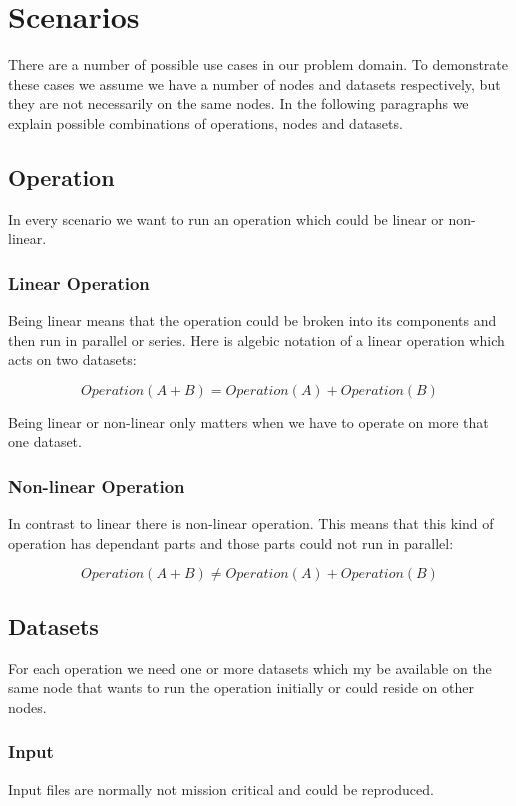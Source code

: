 \chapter{Scenarios}
\label{cha:scenarios}

There are a number of possible use cases in our problem domain. To demonstrate these cases we assume
we have a number of nodes and datasets respectively, but they are not necessarily on the same nodes.
In the following paragraphs we explain possible combinations of operations, nodes and datasets.

\section{Operation}
In every scenario we want to run an operation which could be linear or non-linear.

\subsection{Linear Operation}
Being linear means that the operation
could be broken into its components and then run in parallel or series. Here is algebic notation
of a linear operation which acts on two datasets:

\[ Operation(A + B) = Operation(A) + Operation(B) \]

Being linear or non-linear only matters when we have to operate on more that one dataset.

\subsection{Non-linear Operation}
In contrast to linear there is non-linear operation. This means that this kind of operation has dependant parts and
those parts could not run in parallel:

\[ Operation(A + B) \neq Operation(A) + Operation(B) \]

\section{Datasets}
For each operation we need one or more datasets which my be available on the same node that wants to run the operation
initially or could reside on other nodes. 

\subsection{Input}
Input files are normally not mission critical and could be reproduced.

